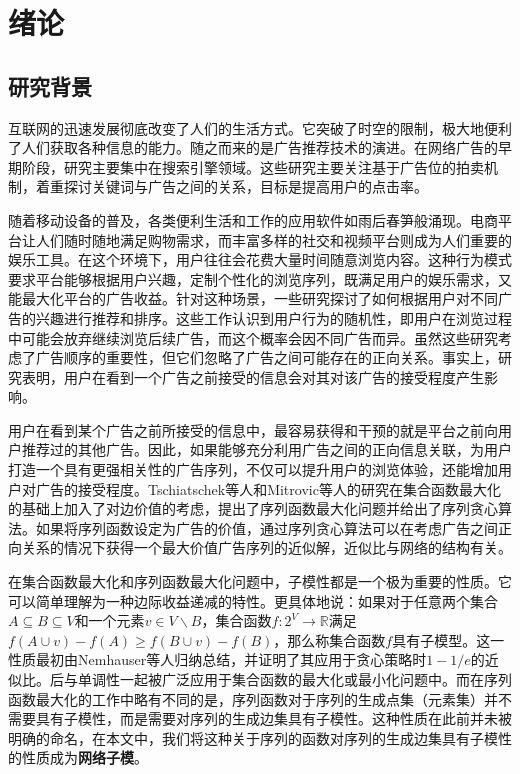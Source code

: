 \chapter{绪论}

\section{研究背景}
互联网的迅速发展彻底改变了人们的生活方式。它突破了时空的限制，极大地便利了人们获取各种信息的能力。随之而来的是广告推荐技术的演进。在网络广告的早期阶段，研究主要集中在搜索引擎领域。这些研究主要关注基于广告位的拍卖机制，着重探讨关键词与广告之间的关系，目标是提高用户的点击率\cite{edelman2007internet,attenberg2009modeling}。

随着移动设备的普及，各类便利生活和工作的应用软件如雨后春笋般涌现。电商平台让人们随时随地满足购物需求，而丰富多样的社交和视频平台则成为人们重要的娱乐工具。在这个环境下，用户往往会花费大量时间随意浏览内容。这种行为模式要求平台能够根据用户兴趣，定制个性化的浏览序列，既满足用户的娱乐需求，又能最大化平台的广告收益。针对这种场景，一些研究\cite{kempe2008cascade,craswell2008experimental,tang2017robust}探讨了如何根据用户对不同广告的兴趣进行推荐和排序。这些工作认识到用户行为的随机性，即用户在浏览过程中可能会放弃继续浏览后续广告，而这个概率会因不同广告而异。虽然这些研究考虑了广告顺序的重要性，但它们忽略了广告之间可能存在的正向关系。事实上，研究表明，用户在看到一个广告之前接受的信息会对其对该广告的接受程度产生影响\cite{loda2005sequence}。

用户在看到某个广告之前所接受的信息中，最容易获得和干预的就是平台之前向用户推荐过的其他广告。因此，如果能够充分利用广告之间的正向信息关联，为用户打造一个具有更强相关性的广告序列，不仅可以提升用户的浏览体验，还能增加用户对广告的接受程度。Tschiatschek等人\cite{tschiatschek2017selecting}和Mitrovic等人\cite{mitrovic2018submodularity}的研究在集合函数最大化的基础上加入了对边价值的考虑，提出了序列函数最大化问题并给出了序列贪心算法。如果将序列函数设定为广告的价值，通过序列贪心算法可以在考虑广告之间正向关系的情况下获得一个最大价值广告序列的近似解，近似比与网络的结构有关。


在集合函数最大化和序列函数最大化问题中，子模性都是一个极为重要的性质。它可以简单理解为一种边际收益递减的特性。更具体地说：如果对于任意两个集合$A\subseteq B \subseteq V$和一个元素$v\in V\backslash B$，集合函数$f: 2^V \to \mathbb{R}$满足$f(A\cup v) - f(A) \ge f(B\cup v) -f(B)$，那么称集合函数$f$具有子模型。这一性质最初由Nemhauser\cite{nemhauser1978analysis}等人归纳总结，并证明了其应用于贪心策略时$1-1/e$的近似比。后与单调性一起被广泛应用于集合函数的最大化或最小化问题中\cite{nemhauser1978best,khuller1999budgeted}。而在序列函数最大化的工作中\cite{tschiatschek2017selecting,mitrovic2018submodularity}略有不同的是，序列函数对于序列的生成点集（元素集）并不需要具有子模性，而是需要对序列的生成边集具有子模性。这种性质在此前并未被明确的命名，在本文中，我们将这种关于序列的函数对序列的生成边集具有子模性的性质成为\textbf{网络子模}。 

